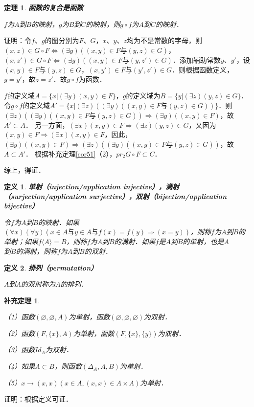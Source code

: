 \documentclass[12pt, a4paper, oneside]{book}
\newtheorem{theo}{定理}
\newtheorem{cor}{补充定理}
\newtheorem{de}{定义}
\begin{document}
			\begin{theo}\label{theo17}
				\textbf{函数的复合是函数}
				\par
				$f$为$A$到$B$的映射，$g$为$B$到$C$的映射，则$g\circ f$为$A$到$C$的映射．
			\end{theo}
			证明：令$f$、$g$的图分别为$F$、$G$，$x$、$y$、$z$均为不是常数的字母，则$(x, z)\in G\circ F\Leftrightarrow (\exists y)((x, y)\in F\text{与}(y, z)\in G)$，$(x, z')\in G\circ F\Leftrightarrow (\exists y)((x, y)\in F\text{与}(y, z')\in G)$．添加辅助常数$y$、$y'$，设$(x, y)\in F\text{与}(y, z)\in G$，$(x, y')\in F\text{与}(y', z')\in G$．则根据函数定义，$y=y'$，故$z=z'$．故$g\circ f$为函数．
			\par
			$f$的定义域$A=\{x|(\exists y)(x, y)\in F\}$，$g$的定义域为$B=\{y|(\exists z)(y, z)\in G\}$．令$g\circ f$的定义域$A'=\{x|(\exists z)((\exists y)((x, y)\in F\text{与}(y, z)\in G))\}$．则$(\exists z)((\exists y)((x, y)\in F\text{与}(y, z)\in G))\Rightarrow (\exists y)((x, y)\in F)$，故$A'\subset A$．
			另一方面，$(\exists x)(x, y)\in F\Rightarrow (\exists z)(y, z)\in G$，又因为$(x, y)\in F\Rightarrow (\exists x)(x, y)\in F$，因此，$(\exists y)((x, y)\in F)\Rightarrow (\exists z)((\exists y)((x, y)\in F\text{与}(y, z)\in G))$，故$A\subset A'$．
			根据补充定理\ref{cor51}（2），$pr_2G\circ F\subset C$．
			\par
			综上，得证．
	
			\begin{de}
				\textbf{单射（injection/application injective），满射（surjection/application surjective），双射（bijection/application bijective）}
				\par
				令$f$为$A$到$B$的映射．如果$(\forall x)(\forall y)(x\in A\text{与}y\in A\text{与}f(x)=f(y)\Rightarrow (x=y))$，则称$f$为$A$到$B$的单射；如果$f\langle A \rangle =B$，则称$f$为$A$到$B$的满射．如果$f$是$A$到$B$的单射，也是$A$\\到$B$的满射，则称$f$为$A$到$B$的双射．
			\end{de}

			\begin{de}
				\textbf{排列（permutation）}
				\par
				$A$到$A$的双射称为$A$的排列．
			\end{de}
			
			\begin{cor}\label{cor74}
				\hfill\par
				（1）函数$(\varnothing, \varnothing, A)$为单射，函数$(\varnothing, \varnothing, \varnothing)$为双射．
				\par
				（2）函数$(F, \{x\}, A)$为单射，函数$(F, \{x\}, \{y\})$为双射．
				\par
				（3）函数$Id_A$为双射．
				\par
				（4）如果$A\subset B$，则函数$(\Delta_A, A, B)$为单射．
				\par
				（5）$x\to (x, x)(x\in A, (x, x)\in A\times A)$为单射．
			\end{cor}
			证明：根据定义可证．				
\end{document}
